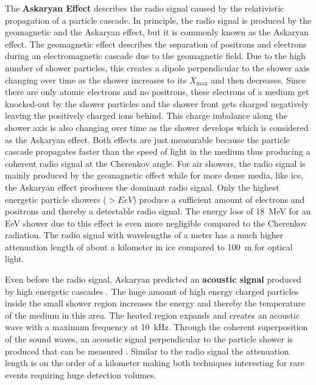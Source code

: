 The \textbf{Askaryan Effect} \cite{Askaryan62} describes the radio signal caused by the relativistic propagation of a particle cascade.
In principle, the radio signal is produced by the geomagnetic and the Askaryan effect, but it is commonly known as the Askaryan effect.
The geomagnetic effect describes the separation of positrons and electrons during an electromagnetic cascade due to the geomagnetic field.
Due to the high number of shower particles, this creates a dipole perpendicular to the shower axis changing over time as the shower increases to its $X_{\text{max}}$ and then decreases.
Since there are only atomic electrons and no positrons, these electrons of a medium get knocked-out by the shower particles and the shower front gets charged negatively leaving the positively charged ions behind.
This charge imbalance along the shower axis is also changing over time as the shower develops which is considered as the Askaryan effect.
Both effects are just measurable because the particle cascade propagates faster than the speed of light in the medium thus producing a coherent radio signal at the Cherenkov angle.
For air showers, the radio signal is mainly produced by the geomagnetic effect while for more dense media, like ice, the Askaryan effect produces the dominant radio signal.
Only the highest energetic particle showers ($>\si{EeV}$) produce a sufficient amount of electrons and positrons and thereby a detectable radio signal.
The energy loss of \SI{18}{MeV} for an EeV shower due to this effect is even more negligible compared to the Cherenkov radiation.
The radio signal with wavelengths of a meter has a much higher attenuation length of about a kilometer in ice compared to \SI{100}{m} for optical light.

Even before the radio signal, Askaryan predicted an \textbf{acoustic signal} produced by high energetic cascades \cite{Askaryan57Acoustic}.
The huge amount of high energy charged particles inside the small shower region increases the energy and thereby the temperature of the medium in this area.
The heated region expands and creates an acoustic wave with a maximum frequency at \SI{10}{kHz}.
Through the coherent superposition of the sound waves, an acoustic signal perpendicular to the particle shower is produced that can be measured \cite{Lahmann16Acustic}.
Similar to the radio signal the attenuation length is on the order of a kilometer making both techniques interesting for rare events requiring huge detection volumes.

